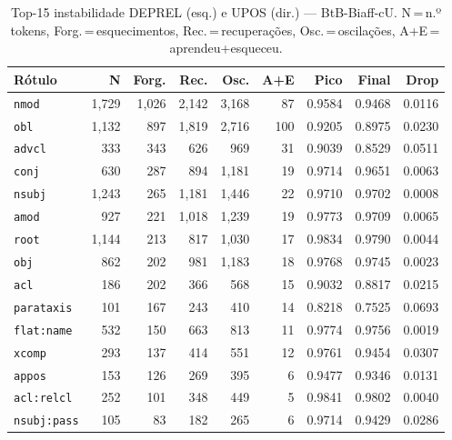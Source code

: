 

\begin{table}[ht]
\centering
\caption{Top-15 instabilidade DEPREL (esq.) e UPOS (dir.) --- BtB-Biaff-cU. N\,=\,n.º tokens, Forg.\,=\,esquecimentos, Rec.\,=\,recuperações, Osc.\,=\,oscilações, A+E\,=\,aprendeu+esqueceu.}
\label{tab:inst-predictions-results-bertimbau-base-biaffine}
\begin{minipage}[t]{0.54\linewidth}
\centering\tiny
\begin{tabular}{lrrrrrrrr}
\toprule
\textbf{Rótulo} & \textbf{N} & \textbf{Forg.} & \textbf{Rec.} & \textbf{Osc.} & \textbf{A+E} & \textbf{Pico} & \textbf{Final} & \textbf{Drop} \\
\midrule
\texttt{nmod} & 1,729 & 1,026 & 2,142 & 3,168 & 87 & 0.9584 & 0.9468 & 0.0116 \\
\texttt{obl} & 1,132 & 897 & 1,819 & 2,716 & 100 & 0.9205 & 0.8975 & 0.0230 \\
\texttt{advcl} & 333 & 343 & 626 & 969 & 31 & 0.9039 & 0.8529 & 0.0511 \\
\texttt{conj} & 630 & 287 & 894 & 1,181 & 19 & 0.9714 & 0.9651 & 0.0063 \\
\texttt{nsubj} & 1,243 & 265 & 1,181 & 1,446 & 22 & 0.9710 & 0.9702 & 0.0008 \\
\texttt{amod} & 927 & 221 & 1,018 & 1,239 & 19 & 0.9773 & 0.9709 & 0.0065 \\
\texttt{root} & 1,144 & 213 & 817 & 1,030 & 17 & 0.9834 & 0.9790 & 0.0044 \\
\texttt{obj} & 862 & 202 & 981 & 1,183 & 18 & 0.9768 & 0.9745 & 0.0023 \\
\texttt{acl} & 186 & 202 & 366 & 568 & 15 & 0.9032 & 0.8817 & 0.0215 \\
\texttt{parataxis} & 101 & 167 & 243 & 410 & 14 & 0.8218 & 0.7525 & 0.0693 \\
\texttt{flat\!:\!name} & 532 & 150 & 663 & 813 & 11 & 0.9774 & 0.9756 & 0.0019 \\
\texttt{xcomp} & 293 & 137 & 414 & 551 & 12 & 0.9761 & 0.9454 & 0.0307 \\
\texttt{appos} & 153 & 126 & 269 & 395 & 6 & 0.9477 & 0.9346 & 0.0131 \\
\texttt{acl\!:\!relcl} & 252 & 101 & 348 & 449 & 5 & 0.9841 & 0.9802 & 0.0040 \\
\texttt{nsubj\!:\!pass} & 105 & 83 & 182 & 265 & 6 & 0.9714 & 0.9429 & 0.0286 \\
\bottomrule
\end{tabular}

\end{minipage}
\end{table}
